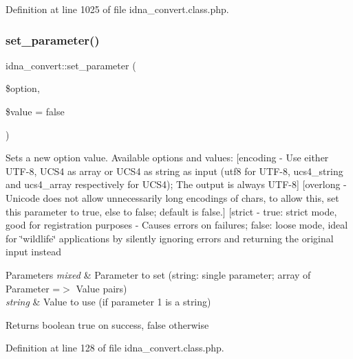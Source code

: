 Definition at line 1025 of file idna\+\_\+convert.\+class.\+php.

\mbox{\label{classidna__convert_a1efc37a8bd5f6b08eed75e0b8e6f074d}} 
\subsubsection{\texorpdfstring{set\+\_\+parameter()}{set\_parameter()}}
{\footnotesize\ttfamily idna\+\_\+convert\+::set\+\_\+parameter (\begin{DoxyParamCaption}\item[{}]{\$option,  }\item[{}]{\$value = {\ttfamily false} }\end{DoxyParamCaption})}

Sets a new option value. Available options and values\+: \mbox{[}encoding -\/ Use either U\+T\+F-\/8, U\+C\+S4 as array or U\+C\+S4 as string as input (\textquotesingle{}utf8\textquotesingle{} for U\+T\+F-\/8, \textquotesingle{}ucs4\+\_\+string\textquotesingle{} and \textquotesingle{}ucs4\+\_\+array\textquotesingle{} respectively for U\+C\+S4); The output is always U\+T\+F-\/8\mbox{]} \mbox{[}overlong -\/ Unicode does not allow unnecessarily long encodings of chars, to allow this, set this parameter to true, else to false; default is false.\mbox{]} \mbox{[}strict -\/ true\+: strict mode, good for registration purposes -\/ Causes errors on failures; false\+: loose mode, ideal for \char`\"{}wildlife\char`\"{} applications by silently ignoring errors and returning the original input instead


\begin{DoxyParams}{Parameters}
{\em mixed} & Parameter to set (string\+: single parameter; array of Parameter =$>$ Value pairs) \\
\hline
{\em string} & Value to use (if parameter 1 is a string) \\
\hline
\end{DoxyParams}
\begin{DoxyReturn}{Returns}
boolean true on success, false otherwise 
\end{DoxyReturn}


Definition at line 128 of file idna\+\_\+convert.\+class.\+php.

\mbox{\label{classidna__convert_a899f287645e43d1fd44a627cdb6b0e79}} 
